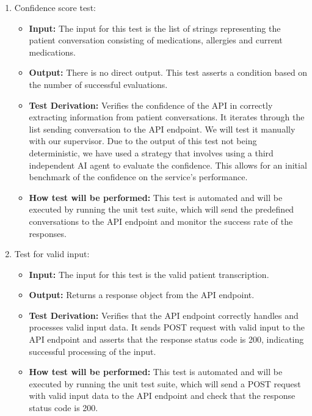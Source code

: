 \documentclass[12pt, titlepage]{article}
\begin{document}
\begin{enumerate}
  \item Confidence score test:
    \begin{itemize}
      \item \textbf{Input:} The input for this test is the list of strings representing the patient conversation consisting of medications, allergies and current medications.   
      \item \textbf{Output:} There is no direct output. This test asserts a condition based on the number of successful evaluations.
      \item \textbf{Test Derivation:} Verifies the confidence of the API in correctly extracting information from patient conversations. It iterates through the list sending conversation to the API endpoint. We will test it manually with our supervisor. Due to the output of this test not being deterministic, we have used a strategy that involves using a third independent AI agent to evaluate the confidence. This allows for an initial benchmark of the confidence on the service's performance.  
      \item \textbf{How test will be performed:} This test is automated and will be executed by running the unit test suite, which will send the predefined conversations to the API endpoint and monitor the success rate of the responses.
    \end{itemize}

  \item Test for valid input:
    \begin{itemize}
      \item \textbf{Input:} The input for this test is the valid patient transcription. 
      \item \textbf{Output:} Returns a response object from the API endpoint. 
      \item \textbf{Test Derivation:} Verifies that the API endpoint correctly handles and processes valid input data. It sends POST request with valid input to the API endpoint and asserts that the response status code is 200, indicating successful processing of the input.
      \item \textbf{How test will be performed:} This test is automated and will be executed by running the unit test suite, which will send a POST request with valid input data to the API endpoint and check that the response status code is 200.
    \end{itemize}


\end{enumerate}
\end{document}
